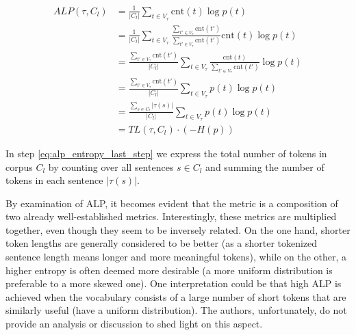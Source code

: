 \begin{align}
ALP(\tau, C_l) &= \frac{1}{|C_l|} \sum_{t \in V_\tau} \mathrm{cnt}(t) \log p(t) \\
&= \frac{1}{|C_l|} \sum_{t \in V_\tau} \frac{\sum_{t' \in V_\tau} \mathrm{cnt}(t')}{\sum_{t' \in V_\tau} \mathrm{cnt}(t')} \mathrm{cnt}(t) \log p(t) \\
&= \frac{\sum_{t' \in V_\tau} \mathrm{cnt}(t')}{|C_l|} \sum_{t \in V_\tau} \frac{\mathrm{cnt}(t)}{\sum_{t' \in V_\tau} \mathrm{cnt}(t')} \log p(t) \\
&= \frac{\sum_{t' \in V_\tau} \mathrm{cnt}(t')}{|C_l|} \sum_{t \in V_\tau} p(t) \log p(t) \\
&= \frac{\sum_{s \in C_l}|\tau(s)|}{|C_l|} \sum_{t \in V_\tau} p(t) \log p(t) \label{eq:alp_entropy_last_step}\\
&= TL(\tau, C_l) \cdot (- H(p))
\end{align}

In step \ref{eq:alp_entropy_last_step} we express the total number of tokens in corpus $C_l$ by counting over all sentences $s \in C_l$ and summing the number of tokens in each sentence $|\tau(s)|$.


By examination of ALP, it becomes evident that the metric is a composition of two already well-established metrics. Interestingly, these metrics are multiplied together, even though they seem to be inversely related. On the one hand, shorter token lengths are generally considered to be better (as a shorter tokenized sentence length means longer and more meaningful tokens), while on the other, a higher entropy is often deemed more desirable (a more uniform distribution is preferable to a more skewed one). One interpretation could be that high ALP is achieved when the vocabulary consists of a large number of short tokens that are similarly useful (have a uniform distribution). The authors, unfortunately, do not provide an analysis or discussion to shed light on this aspect.

